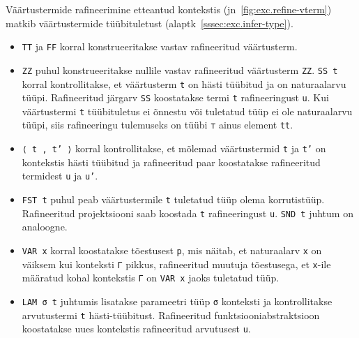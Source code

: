 \documentclass[a4paper,12pt]{article}
\begin{document}
Väärtustermide rafineerimine etteantud kontekstis (jn~\ref{fig:exc.refine-vterm}) matkib väärtustermide tüübituletust (alaptk~\ref{sssec:exc.infer-type}).
\begin{itemize}
\item {\tt TT} ja {\tt FF} korral konstrueeritakse vastav rafineeritud väärtusterm.
\item {\tt ZZ} puhul konstrueeritakse nullile vastav rafineeritud väärtusterm {\tt ZZ}. {\tt SS t} korral kontrollitakse, et väärtusterm {\tt t} on hästi tüübitud ja on naturaalarvu tüüpi. Rafineeritud järgarv {\tt SS} koostatakse termi {\tt t} rafineeringust {\tt u}. Kui väärtustermi {\tt t} tüübituletus ei õnnestu või tuletatud tüüp ei ole naturaalarvu tüüpi, siis rafineeringu tulemuseks on tüübi {\tt ⊤} ainus element {\tt tt}.
\item {\tt ⟨ t , t' ⟩} korral kontrollitakse, et mõlemad väärtustermid {\tt t} ja {\tt t'} on kontekstis hästi tüübitud ja rafineeritud paar koostatakse rafineeritud termidest {\tt u} ja {\tt u'}.
\item {\tt FST t} puhul peab väärtustermile {\tt t} tuletatud tüüp olema korrutistüüp. Rafineeritud projektsiooni saab koostada {\tt t} rafineeringust {\tt u}. {\tt SND t} juhtum on analoogne.
\item {\tt VAR x} korral koostatakse tõestusest {\tt p}, mis näitab, et naturaalarv {\tt x} on väiksem kui konteksti {\tt Γ} pikkus, rafineeritud muutuja tõestusega, et {\tt x}-ile määratud kohal kontekstis {\tt Γ} on {\tt VAR x} jaoks tuletatud tüüp.
\item {\tt LAM σ t} juhtumis lisatakse parameetri tüüp {\tt σ} konteksti ja kontrollitakse arvutustermi {\tt t} hästi-tüübitust. Rafineeritud funktsiooniabstraktsioon koostatakse uues kontekstis rafineeritud arvutusest {\tt u}.
\end{itemize}
\end{document}
